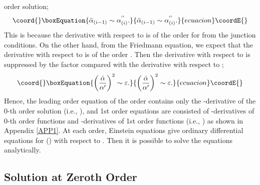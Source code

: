 \documentclass[a4paper,11pt]{article}
\begin{document}
order solution;
\begin{equation}\coord{}\boxEquation{
\ddot{\alpha}_{(i-1)} \sim \alpha^{''}_{(i)}.
}{
\ddot{\alpha}_{(i-1)} \sim \alpha^{''}_{(i)}.
}{ecuacion}\coordE{}\end{equation}
This is because the derivative 
with respect to \coordHE{}
is of the order \coordHE{} for \coordHE{} 
from the junction conditions.
On the other hand, from the Friedmann equation, we expect 
that the derivative with respect to \coordHE{} is of the order 
\myHighlight{$\dot{\alpha}^2 \sim \kappa^2 \sigma \rho$}\coordHE{}. Then the derivative
with respect to \coordHE{} is suppressed by the factor \coordHE{}
compared with the derivative with respect to \coordHE{};
\begin{equation}\coord{}\boxEquation{
\left( \frac{\dot{\alpha}}{\alpha'} \right)^2  \sim \varepsilon.
}{
\left( \frac{\dot{\alpha}}{\alpha'} \right)^2  \sim \varepsilon.
}{ecuacion}\coordE{}\end{equation}
Hence, the leading order equation of the order \coordHE{} 
contains only the \coordHE{}-derivative of the 0-th order solution
(i.e., \coordHE{}),  
and 1st order equations are consisted of \coordHE{}-derivatives of 0-th 
order functions and \myHighlight{$y$}\coordHE{}-derivatives of 1st order functions 
(i.e., \myHighlight{$\ddot{\alpha}_{(0)}, \ \ddot{\beta}_{(0)}, \cdots, \ 
 \alpha_{(1)}^{\prime\prime},\ \ \beta_{(1)}^{\prime\prime}, 
\cdots$}\coordHE{}) as shown in Appendix \ref{APP1}. 
At each order, Einstein equations give 
ordinary differential equations for (\myHighlight{$\alpha_{(i)},\ \beta_{(i)},
\cdots$}\coordHE{}) with respect to \coordHE{}. Then it is possible to solve the 
equations analytically.

   
\subsection{Solution at Zeroth Order} 
\end{document}
